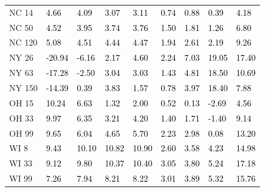 \begin{tabular}{lllllllll}
NC 14 & \textcolor{black}{ 4.66 } & \textcolor{black}{ 4.09 } & \textcolor{black}{ 3.07 } & \textcolor{black}{ 3.11 } & \textcolor{black}{ 0.74 } & \textcolor{black}{ 0.88 } & \textcolor{black}{ 0.39 } & \textcolor{black}{ 4.18 } \\
NC 50 & \textcolor{black}{ 4.52 } & \textcolor{black}{ 3.95 } & \textcolor{black}{ 3.74 } & \textcolor{black}{ 3.76 } & \textcolor{black}{ 1.50 } & \textcolor{black}{ 1.81 } & \textcolor{black}{ 1.26 } & \textcolor{black}{ 6.80 } \\
NC 120 & \textcolor{black}{ 5.08 } & \textcolor{black}{ 4.51 } & \textcolor{black}{ 4.44 } & \textcolor{black}{ 4.47 } & \textcolor{black}{ 1.94 } & \textcolor{black}{ 2.61 } & \textcolor{black}{ 2.19 } & \textcolor{black}{ 9.26 } \\
NY 26 & \textcolor{black}{ -20.94 } & \textcolor{black}{ -6.16 } & \textcolor{black}{ 2.17 } & \textcolor{black}{ 4.60 } & \textcolor{black}{ 2.24 } & \textcolor{black}{ 7.03 } & \textcolor{black}{ 19.05 } & \textcolor{black}{ 17.40 } \\
NY 63 & \textcolor{black}{ -17.28 } & \textcolor{black}{ -2.50 } & \textcolor{black}{ 3.04 } & \textcolor{black}{ 3.03 } & \textcolor{black}{ 1.43 } & \textcolor{black}{ 4.81 } & \textcolor{black}{ 18.50 } & \textcolor{black}{ 10.69 } \\
NY 150 & \textcolor{black}{ -14.39 } & \textcolor{black}{ 0.39 } & \textcolor{black}{ 3.83 } & \textcolor{black}{ 1.57 } & \textcolor{black}{ 0.78 } & \textcolor{black}{ 3.97 } & \textcolor{black}{ 18.40 } & \textcolor{black}{ 7.88 } \\
OH 15 & \textcolor{black}{ 10.24 } & \textcolor{black}{ 6.63 } & \textcolor{black}{ 1.32 } & \textcolor{black}{ 2.00 } & \textcolor{black}{ 0.52 } & \textcolor{black}{ 0.13 } & \textcolor{black}{ -2.69 } & \textcolor{black}{ 4.56 } \\
OH 33 & \textcolor{black}{ 9.97 } & \textcolor{black}{ 6.35 } & \textcolor{black}{ 3.21 } & \textcolor{black}{ 4.20 } & \textcolor{black}{ 1.40 } & \textcolor{black}{ 1.71 } & \textcolor{black}{ -1.40 } & \textcolor{black}{ 9.14 } \\
OH 99 & \textcolor{black}{ 9.65 } & \textcolor{black}{ 6.04 } & \textcolor{black}{ 4.65 } & \textcolor{black}{ 5.70 } & \textcolor{black}{ 2.23 } & \textcolor{black}{ 2.98 } & \textcolor{black}{ 0.08 } & \textcolor{black}{ 13.20 } \\
WI 8 & \textcolor{black}{ 9.43 } & \textcolor{black}{ 10.10 } & \textcolor{black}{ 10.82 } & \textcolor{black}{ 10.90 } & \textcolor{black}{ 2.60 } & \textcolor{black}{ 3.58 } & \textcolor{black}{ 4.23 } & \textcolor{black}{ 14.98 } \\
WI 33 & \textcolor{black}{ 9.12 } & \textcolor{black}{ 9.80 } & \textcolor{black}{ 10.37 } & \textcolor{black}{ 10.40 } & \textcolor{black}{ 3.05 } & \textcolor{black}{ 3.80 } & \textcolor{black}{ 5.24 } & \textcolor{black}{ 17.18 } \\
WI 99 & \textcolor{black}{ 7.26 } & \textcolor{black}{ 7.94 } & \textcolor{black}{ 8.21 } & \textcolor{black}{ 8.22 } & \textcolor{black}{ 3.01 } & \textcolor{black}{ 3.89 } & \textcolor{black}{ 5.32 } & \textcolor{black}{ 15.76 } \\
\bottomrule
\end{tabular}
